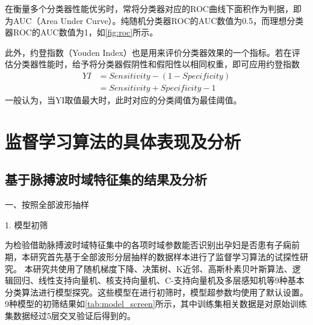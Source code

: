在衡量多个分类器性能优劣时，常将分类器对应的ROC曲线下面积作为判据，即为AUC（Area Under Curve）。纯随机分类器ROC的AUC数值为0.5，而理想分类器ROC的AUC数值为1，如\autoref{fig:roc}所示。

此外，约登指数（Youden Index）也是用来评价分类器效果的一个指标。若在评估分类器性能时，给予将分类器假阴性和假阳性以相同权重，即可应用约登指数
\begin{equation}
      \label{equ:yi}
      \begin{aligned}
            YI&=Sensitivity-(1-Specificity)\\
            &=Sensitivity+Specificity-1
      \end{aligned}
\end{equation}
一般认为，当YI取值最大时，此时对应的分类阈值为最佳阈值\cite{cwl}。
\section{监督学习算法的具体表现及分析}
\subsection{基于脉搏波时域特征集的结果及分析}
一、按照全部波形抽样

1. 模型初筛

为检验借助脉搏波时域特征集中的各项时域参数能否识别出孕妇是否患有子痫前期，本研究首先基于全部波形分层抽样的数据样本进行了监督学习算法的试探性研究\cite{scikit-learn}。
本研究共使用了随机梯度下降、决策树、K近邻、高斯朴素贝叶斯算法、逻辑回归、线性支持向量机、核支持向量机、C-支持向量机及多层感知机等9种基本分类算法进行模型探究。这些模型在进行初筛时，模型超参数均使用了默认设置\cite{scikit-learn}。
9种模型的初筛结果如\autoref{tab:model_screen}所示，其中训练集相关数据是对原始训练集数据经过5层交叉验证后得到的。

